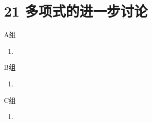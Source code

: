 \section*{21 多项式的进一步讨论}

\vspace{2ex}

\centerline{\heiti A组}
\begin{enumerate}
    \item
\end{enumerate}

\centerline{\heiti B组}
\begin{enumerate}
    \item
\end{enumerate}

\centerline{\heiti C组}
\begin{enumerate}
    \item
\end{enumerate}

\clearpage
